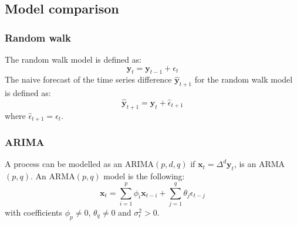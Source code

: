 \documentclass[compress,red]{beamer}
\begin{document}

\subsection{Model comparison} 
\begin{frame}
\frametitle{Random walk}
The random walk model is defined as:
\begin{equation}
\mathbf{y}_t = \mathbf{y}_{t-1} + \epsilon_{t}
\label{rwmodel}
\end{equation}
The naive forecast of the time series difference $\hat{\mathbf{y}}_{t+1}$ for the random walk model is defined as:
\begin{equation}
\hat{\mathbf{y}}_{t+1} = \mathbf{y}_t + \hat{\epsilon}_{t+1} 
\end{equation}
\noindent where  $\hat{\epsilon}_{t+1} = \epsilon_{t}$.
\end{frame}


\begin{frame}
\frametitle{ARIMA}
A process can be modelled as an ARIMA$(p,d,q)$ if $\mathbf{x}_t = \Delta^d \mathbf{y}_t $, is an ARMA$(p,q)$. An ARMA$(p,q)$ model is the following:
\begin{equation}
\mathbf{x}_t = \sum_{i=1}^p \phi_i \mathbf{x}_{t-i}  +  \sum_{j=1}^q \theta_j \epsilon_{t-j}  
\end{equation}
\noindent with coefficients $\phi_p \neq 0$, $\theta_q \neq 0$ and $\sigma_{\epsilon}^2 > 0$.
\end{frame}
\end{document}
